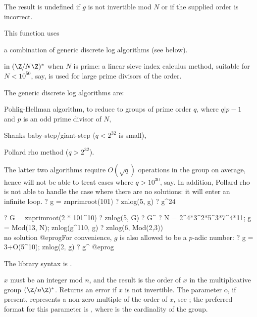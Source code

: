 The result is undefined if $g$ is not invertible mod $N$ or if the supplied
order is incorrect.

This function uses

\item a combination of generic discrete log algorithms (see below).

\item in $(\Z/N\Z)^*$ when $N$ is prime: a linear sieve index calculus
method, suitable for $N < 10^{50}$, say, is used for large prime divisors of
the order.

The generic discrete log algorithms are:

\item Pohlig-Hellman algorithm, to reduce to groups of prime order $q$,
where $q | p-1$ and $p$ is an odd prime divisor of $N$,

\item Shanks baby-step/giant-step ($q < 2^{32}$ is small),

\item Pollard rho method ($q > 2^{32}$).

The latter two algorithms require $O(\sqrt{q})$ operations in the group on
average, hence will not be able to treat cases where $q > 10^{30}$, say.
In addition, Pollard rho is not able to handle the case where there are no
solutions: it will enter an infinite loop.
\bprog
? g = znprimroot(101)
? znlog(5, g)
? g^24

? G = znprimroot(2 * 101^10)
? znlog(5, G)
? G^%
? N = 2^4*3^2*5^3*7^4*11; g = Mod(13, N); znlog(g^110, g)
? znlog(6, Mod(2,3))  \\ no solution
@eprog\noindent For convenience, $g$ is also allowed to be a $p$-adic number:
\bprog
? g = 3+O(5^10); znlog(2, g)
? g^%
@eprog

The library syntax is .

\label{se:znorder}
$x$ must be an integer mod $n$, and the
result is the order of $x$ in the multiplicative group $(\Z/n\Z)^*$. Returns
an error if $x$ is not invertible.
The parameter o, if present, represents a non-zero
multiple of the order of $x$, see ; the preferred format for
this parameter is , where 
is the cardinality of the group.


